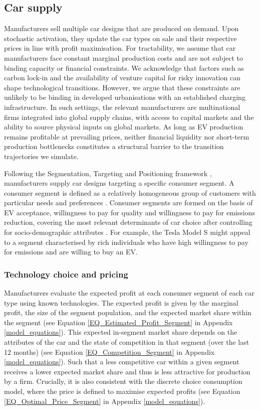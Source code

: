 \documentclass[12pt]{article}
\begin{document}
	\subsection{Car supply}
	Manufacturers sell multiple car designs that are produced on demand. Upon stochastic activation, they update the car types on sale and their respective prices in line with profit maximisation. For tractability, we assume that car manufacturers face constant marginal production costs and are not subject to binding capacity or financial constraints. We acknowledge that factors such as carbon lock-in \citep{unruh2000understanding,unruh2002escaping} and the availability of venture capital for risky innovation \citep{mazzucato2013financing,mazzucato2017public} can shape technological transitions. However, we argue that these constraints are unlikely to be binding in developed urbanisations with an established charging infrastructure. In such settings, the relevant manufacturers are multinational firms integrated into global supply chains, with access to capital markets and the ability to source physical inputs on global markets. As long as EV production remains profitable at prevailing prices, neither financial liquidity nor short-term production bottlenecks constitutes a structural barrier to the transition trajectories we simulate.
	
	Following the Segmentation, Targeting and Positioning framework \citep{kotler1989mass}, manufacturers supply car designs targeting a specific consumer segment. A consumer segment is defined as a relatively homogeneous group of customers with particular needs and preferences \citep{lynn2012segmenting}. Consumer segments are formed on the basis of EV acceptance, willingness to pay for quality and willingness to pay for emissions reduction, covering the most relevant determinants of car choice after controlling for socio-demographic attributes \citep{axsen2013vehicles,keyes2018vehicles,jang2021vehicles}. For example, the Tesla Model S might appeal to a segment characterised by rich individuals who have high willingness to pay for emissions and are willing to buy an EV. 
	
	\subsubsection{Technology choice and pricing}\label{Supply:Choice_Pricing}
	Manufacturers evaluate the expected profit at each consumer segment of each car type using known technologies. The expected profit is given by the marginal profit, the size of the segment population, and the expected market share within the segment (see Equation \ref{EQ_Estimated_Profit_Segment} in Appendix \ref{model_equations}). This expected in-segment market share depends on the attributes of the car and the state of competition in that segment (over the last 12 months) (see Equation \ref{EQ_Competition_Segment} in Appendix \ref{model_equations}). Such that a less competitive car within a given segment receives a lower expected market share and thus is less attractive for production by a firm. Crucially, it is also consistent with the discrete choice consumption model, where the price is defined to maximise expected profits (see Equation \ref{EQ_Optimal_Price_Segment} in Appendix \ref{model_equations}).
	
\end{document}
